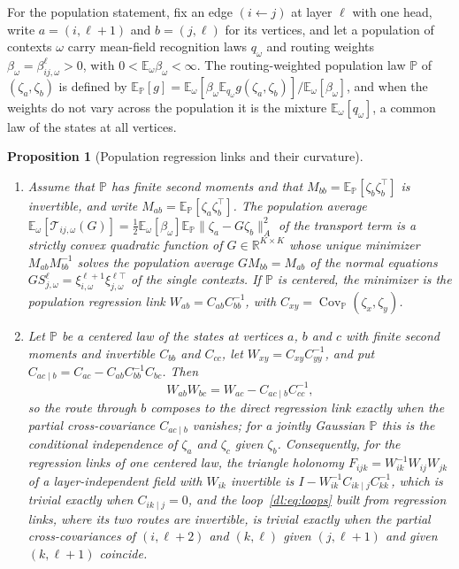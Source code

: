 \documentclass[11pt]{article}
\newtheorem{proposition}[theorem]{Proposition}
\theoremstyle{definition}
\theoremstyle{remark}
\newcommand{\E}{\mathbb E}
\newcommand{\R}{\mathbb R}
\begin{document}
For the population statement, fix an edge $(i\leftarrow j)$ at layer $\ell$ with one head, write $a=(i,\ell+1)$ and $b=(j,\ell)$ for its vertices, and let a population of contexts $\omega$ carry mean-field recognition laws $q_\omega$ and routing weights $\beta_\omega=\beta_{ij,\omega}^\ell>0$, with $0<\E_\omega\beta_\omega<\infty$. The routing-weighted population law $\mathbb P$ of $(\zeta_a,\zeta_b)$ is defined by $\E_{\mathbb P}[g]=\E_\omega[\beta_\omega\E_{q_\omega}g(\zeta_a,\zeta_b)]/\E_\omega[\beta_\omega]$, and when the weights do not vary across the population it is the mixture $\E_\omega[q_\omega]$, a common law of the states at all vertices.

\begin{proposition}[Population regression links and their curvature]
\label{dl:prop:regression}
\begin{enumerate}
\item[(i)] Assume that $\mathbb P$ has finite second moments and that $M_{bb}=\E_{\mathbb P}[\zeta_b\zeta_b^\top]$ is invertible, and write $M_{ab}=\E_{\mathbb P}[\zeta_a\zeta_b^\top]$. The population average $\E_\omega[\mathcal T_{ij,\omega}(G)]=\tfrac12\E_\omega[\beta_\omega]\E_{\mathbb P}\|\zeta_a-G\zeta_b\|_A^2$ of the transport term is a strictly convex quadratic function of $G\in\R^{K\times K}$ whose unique minimizer $M_{ab}M_{bb}^{-1}$ solves the population average $GM_{bb}=M_{ab}$ of the normal equations $GS_{j,\omega}^\ell=\xi_{i,\omega}^{\ell+1}\xi_{j,\omega}^{\ell\top}$ of the single contexts. If $\mathbb P$ is centered, the minimizer is the population regression link $W_{ab}=C_{ab}C_{bb}^{-1}$, with $C_{xy}=\operatorname{Cov}_{\mathbb P}(\zeta_x,\zeta_y)$.
\item[(ii)] Let $\mathbb P$ be a centered law of the states at vertices $a$, $b$ and $c$ with finite second moments and invertible $C_{bb}$ and $C_{cc}$, let $W_{xy}=C_{xy}C_{yy}^{-1}$, and put $C_{ac\mid b}=C_{ac}-C_{ab}C_{bb}^{-1}C_{bc}$. Then
\begin{equation}
W_{ab}W_{bc}=W_{ac}-C_{ac\mid b}C_{cc}^{-1},
\label{dl:eq:partialcov}
\end{equation}
so the route through $b$ composes to the direct regression link exactly when the partial cross-covariance $C_{ac\mid b}$ vanishes; for a jointly Gaussian $\mathbb P$ this is the conditional independence of $\zeta_a$ and $\zeta_c$ given $\zeta_b$. Consequently, for the regression links of one centered law, the triangle holonomy $F_{ijk}=W_{ik}^{-1}W_{ij}W_{jk}$ of a layer-independent field with $W_{ik}$ invertible is $I-W_{ik}^{-1}C_{ik\mid j}C_{kk}^{-1}$, which is trivial exactly when $C_{ik\mid j}=0$, and the loop~\eqref{dl:eq:loops} built from regression links, where its two routes are invertible, is trivial exactly when the partial cross-covariances of $(i,\ell+2)$ and $(k,\ell)$ given $(j,\ell+1)$ and given $(k,\ell+1)$ coincide.
\end{enumerate}
\end{proposition}
\end{document}
